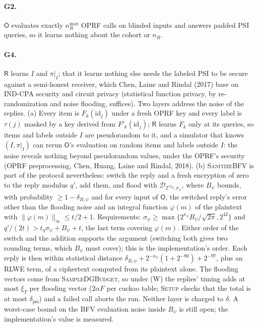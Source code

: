 \documentclass[11pt]{article}
\theoremstyle{definition}
\theoremstyle{plain}
\newcommand{\Rp}{\mathsf{R}}
\newcommand{\Op}{\mathsf{O}}
\newcommand{\Z}{\mathbb{Z}}
\begin{document}
\paragraph{G2.} $\Op$ evaluates exactly $n_R^{\max}$ OPRF calls on blinded inputs and answers padded PSI queries, so it learns nothing about the cohort or $n_R$.

\paragraph{G4.} $\Rp$ learns $I$ and $\pi|_I$; that it learns nothing else needs the labeled PSI to be secure against a semi-honest receiver, which Chen, Laine and Rindal (2017) base on IND-CPA security and circuit privacy (statistical function privacy, by re-randomization and noise flooding, suffices). Two layers address the noise of the replies. (a) Every item is $F_k(\mathrm{id}_j)$ under a fresh OPRF key and every label is $\tau(j)$ masked by a key derived from $F'_k(\mathrm{id}_j)$; $\Rp$ learns $F_k$ only at its queries, so items and labels outside $I$ are pseudorandom to it, and a simulator that knows $(I,\pi|_I)$ can rerun $\Op$'s evaluation on random items and labels outside $I$: the noise reveals nothing beyond pseudorandom values, under the OPRF's security (OPRF preprocessing, Chen, Huang, Laine and Rindal, 2018). (b) \textsc{SanitizeBFV} is part of the protocol nevertheless: switch the reply and a fresh encryption of zero to the reply modulus $q'$, add them, and flood with $\mathcal D_{\Z^{N_B},\sigma_\psi}$, where $B_\psi$ bounds, with probability $\ge1-\delta_{B,\psi}$ and for every input of $\Op$, the switched reply's error other than the flooding noise and an integral function $\varphi(m)$ of the plaintext with $\|\varphi(m)\|_\infty\le t/2+1$. Requirements: $\sigma_\psi\ge\max\{2^{\kappa_\psi}B_\psi/\sqrt{2\pi},2^{42}\}$ and $q'/(2t)>t_\eta\sigma_\psi+B_\psi+t$, the last term covering $\varphi(m)$. Either order of the switch and the addition supports the argument (switching both gives two rounding terms, which $B_\psi$ must cover); this is the implementation's order. Each reply is then within statistical distance $\delta_{B,\psi}+2^{-\kappa_\psi}(1+2^{-80})+2^{-97}$, plus an RLWE term, of a ciphertext computed from its plaintext alone. The flooding vectors come from \textsc{SampleDGBudget}, so under (W) the replies' timing adds at most $\xi_T$ per flooding vector ($2\alpha F$ per cuckoo table; \textsc{Setup} checks that the total is at most $\delta_{\mathrm{psi}}$) and a failed call aborts the run. Neither layer is charged to $\delta$. A worst-case bound on the BFV evaluation noise inside $B_\psi$ is still open; the implementation's value is measured.
\end{document}
